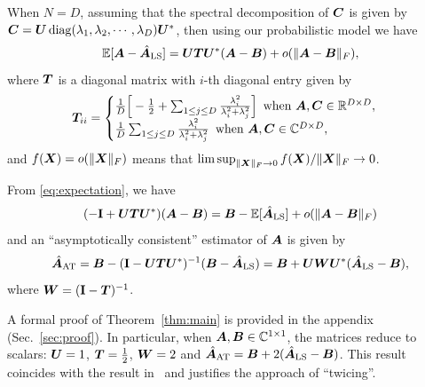 \begin{thm}\label{thm:main}
When  $N = D$, assuming that the spectral decomposition of $\boldsymbol{C}$ is given by 
$\boldsymbol{C}=\boldsymbol{U}\operatorname{diag}(\lambda_1,\lambda_2,\cdots,\lambda_D)\boldsymbol{U}^*$, then using our 
probabilistic model we have \begin{equation}\label{eq:expectation}
\operatorname{\mathbb{E}}[\boldsymbol{A}-\hat{\boldsymbol{A}}_{\text{LS}}]=\boldsymbol{U}\boldsymbol{T}\boldsymbol{U}^*(\boldsymbol{A}-\boldsymbol{B}) + o(\|\boldsymbol{A}-\boldsymbol{B}\|_F),
\end{equation}
where $\boldsymbol{T}$ is a diagonal matrix with $i$-th diagonal entry given by 
\[\boldsymbol{T}_{ii}=\begin{cases}\frac{1}{D}\Big[-\frac{1}{2}+\sum_{1\leq j\leq 
D}\frac{\lambda_i^2}{\lambda_i^2+\lambda_j^2}\Big]\,\,\,\text{when 
$\boldsymbol{A},\boldsymbol{C}\in\mathbb{R}^{D\times D}$},\\\frac{1}{D}\sum_{1\leq j\leq 
D}\frac{\lambda_i^2}{\lambda_i^2+\lambda_j^2}
\,\,\,\text{when $\boldsymbol{A},\boldsymbol{C}\in\mathbb{C}^{D\times D}$},
\end{cases}\] 
and $f(\boldsymbol{X})=o(\|\boldsymbol{X}\|_F)$ means that $\limsup_{\|\boldsymbol{X}\|_F\rightarrow
0}{f(\boldsymbol{X})/\|\boldsymbol{X}\|_F}\rightarrow 0$.
\end{thm}
 
From \eqref{eq:expectation}, we have 
\[
(-\mathbf{I}+\boldsymbol{U}\boldsymbol{T}\boldsymbol{U}^*)(\boldsymbol{A}-\boldsymbol{B})=\boldsymbol{B} - \operatorname{\mathbb{E}}[\hat{\boldsymbol{A}}_{\text{LS}}] + o(\|\boldsymbol{A}-\boldsymbol{B}\|_F) 
\]
and an ``asymptotically consistent'' estimator of $\boldsymbol{A}$ is given by
\begin{equation}\label{eq:solution}
\hat{\boldsymbol{A}}_{\text{AT}}=\boldsymbol{B}-(\mathbf{I}-\boldsymbol{U}\boldsymbol{T}\boldsymbol{U}^*)^{-1}(\boldsymbol{B}-\hat{\boldsymbol{A}}_{\text{LS}}) =\boldsymbol{B}+\boldsymbol{U}\boldsymbol{W}\boldsymbol{U}^*(\hat{\boldsymbol{A}}_{\text{LS}}-\boldsymbol{B}),
\end{equation}
 where $\boldsymbol{W}=(\mathbf{I}-\boldsymbol{T})^{-1}$. 
 
A formal proof
of Theorem~\ref{thm:main} is provided in the appendix (Sec.~\ref{sec:proof}). In particular, when $\boldsymbol{A},\boldsymbol{B}\in\mathbb{C}^{1\times 1}$, the matrices reduce to 
scalars: $\boldsymbol{U}=1$, $\boldsymbol{T}=\frac{1}{2}$, $\boldsymbol{W}=2$ and 
$\hat{\boldsymbol{A}}_{\text{AT}}=\boldsymbol{B}+2(\hat{\boldsymbol{A}}_{\text{LS}}-\boldsymbol{B})$. This result coincides
with the result in~\cite{Main1979} and justifies the approach of ``twicing''. 


